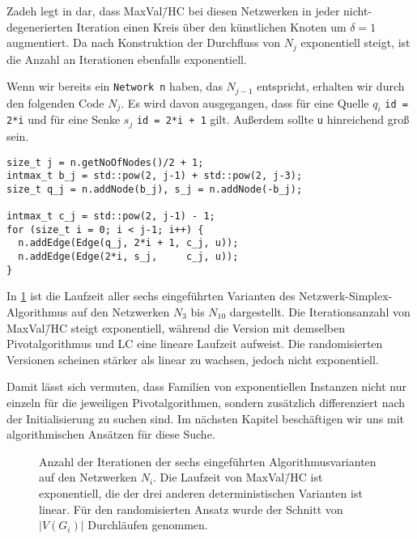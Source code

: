 Zadeh legt in \cite[S. 263\,f.]{Exponential} dar, dass MaxVal\=/HC bei diesen Netzwerken in jeder nicht-degenerierten Iteration einen Kreis über den künstlichen Knoten um $\delta=1$ augmentiert. Da nach Konstruktion der Durchfluss von $N_j$ exponentiell steigt, ist die Anzahl an Iterationen ebenfalls exponentiell.

Wenn wir bereits ein \lstinline|Network n| haben, das $N_{j-1}$ entspricht, erhalten wir durch den folgenden Code $N_{j}$. Es wird davon ausgegangen, dass für eine Quelle $q_i$ \lstinline|id = 2*i| und für eine Senke $s_j$ \lstinline|id = 2*i + 1| gilt. Außerdem sollte \lstinline|u| hinreichend groß sein.

\begin{lstlisting}
size_t j = n.getNoOfNodes()/2 + 1;
intmax_t b_j = std::pow(2, j-1) + std::pow(2, j-3);
size_t q_j = n.addNode(b_j), s_j = n.addNode(-b_j);

intmax_t c_j = std::pow(2, j-1) - 1;
for (size_t i = 0; i < j-1; i++) {
  n.addEdge(Edge(q_j, 2*i + 1, c_j, u));
  n.addEdge(Edge(2*i, s_j,     c_j, u));
}
\end{lstlisting}

In \cref{fig:plot_exp} ist die Laufzeit aller sechs eingeführten Varianten des Netzwerk-Simplex-Algorithmus auf den Netzwerken $N_3$ bis $N_{10}$ dargestellt. Die Iterationsanzahl von MaxVal\=/HC steigt exponentiell, während die Version mit demselben Pivotalgorithmus und LC eine lineare Laufzeit aufweist. Die randomisierten Versionen scheinen stärker als linear zu wachsen, jedoch nicht exponentiell.

Damit lässt sich vermuten, dass Familien von exponentiellen Instanzen nicht nur einzeln für die jeweiligen Pivotalgorithmen, sondern zusätzlich differenziert nach der Initialisierung zu suchen sind. Im nächsten Kapitel beschäftigen wir uns mit algorithmischen Ansätzen für diese Suche. 

\begin{figure}[!ht]\centering
    
    \caption{Anzahl der Iterationen der sechs eingeführten Algorithmusvarianten auf den Netzwerken $N_i$. Die Laufzeit von MaxVal\=/HC ist exponentiell, die der drei anderen deterministischen Varianten ist linear. Für den randomisierten Ansatz wurde der Schnitt von $|V(G_i)|$ Durchläufen genommen.}
    \label{fig:plot_exp}
\end{figure}

